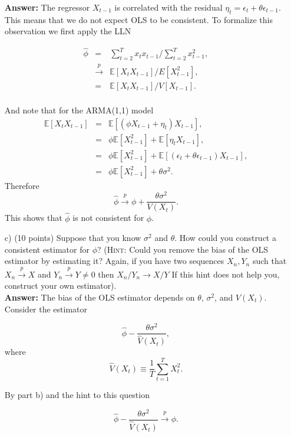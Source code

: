 \documentclass[12] {article}
\begin{document}
\begin{itemize}
\textbf{Answer:} The regressor $X_{t-1}$ is correlated with the residual $\eta_t = \epsilon_t + \theta \epsilon_{t-1}$. This means that we do not expect OLS to be consistent. To formalize this observation we first apply the LLN

\begin{eqnarray*}
 \widehat{\phi} &=&  \sum_{t=2}^{T} x_t x_{t-1} \Big / \sum_{t=2}^{T} x_{t-1}^2, \\
 & \overset{p}{\rightarrow}& \mathbb{E}[X_{t} X_{t-1} ] / E[X^2_{t-1}], \\
 &=& \mathbb{E}[X_{t} X_{t-1} ] / V[X_{t-1}]. \\
\end{eqnarray*}

And note that for the ARMA(1,1) model
\begin{eqnarray*}
\mathbb{E} [X_t X_{t-1}] &=& \mathbb{E} [ \left( \phi X_{t-1} + \eta_t \right)X_{t-1}], \\
&=& \phi \mathbb{E}[X_{t-1}^2] + \mathbb{E}[\eta_t X_{t-1}], \\
&=& \phi \mathbb{E}[X_{t-1}^2] +\mathbb{E}[ (\epsilon_t + \theta \epsilon_{t-1}) X_{t-1}],\\
&=& \phi \mathbb{E}[X_{t-1}^2] + \theta \sigma^2.
\end{eqnarray*}
Therefore
\[  \widehat{\phi}  \overset{p}{\rightarrow} \phi + \frac{\theta \sigma^2}{V(X_{t})}. \]
This shows that $ \widehat{\phi} $ is not consistent for $\phi$. 


\item [c)] (10 points) Suppose that you know $\sigma^2$ and $\theta$. How could you construct a consistent estimator for $\phi$? ({\scshape{Hint:}} Could you remove the bias of the OLS estimator by estimating it? Again, if you have two sequences $X_n, Y_n$ such that $X_n \overset{p}{\rightarrow} X$ and $Y_n \overset{p}{\rightarrow} Y \neq 0$ then $X_n / Y_n \rightarrow X/Y$ If this hint does not help you, construct your own estimator). \\

\textbf{Answer:} The bias of the OLS estimator depends on $\theta$, $\sigma^2$, and $V(X_t)$. Consider the estimator 

\[ \widehat{\phi} - \frac{\theta \sigma^2}{ \widehat{V}(X_t)}, \]
where
\[\widehat{V}(X_t) \equiv \frac{1}{T} \sum_{t=1}^{T} X_t^2. \]

By part b) and the hint to this question

\[\widehat{\phi} - \frac{\theta \sigma^2}{ \widehat{V}(X_t)}  \overset{p}{\rightarrow} \phi. \]


\end{itemize}
\end{document}
